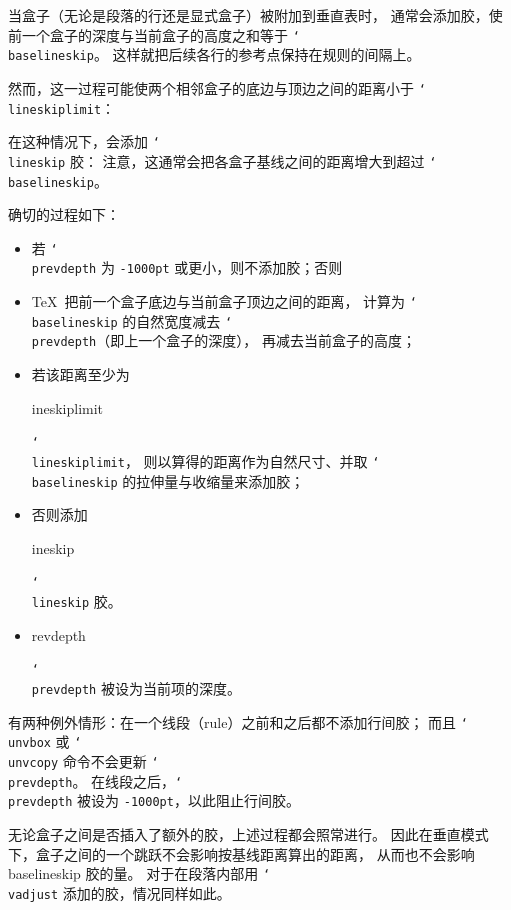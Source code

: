\documentclass[a4paper]{rapport3}
\makeatletter
\def\nl{\protect\\}\def\n#1{{\tt #1}}\def\cs#1{{\tt\char`\\#1}}\let\csc\cs
\newenvironment{disp}{\begin{quotation}}{\end{quotation}}
\def\cstoidx#1\par{\index{#1@\cs{#1}}}
\def\csidx#1{\cstoidx #1\par\cs{#1}}
\makeatother
\begin{document}
当盒子（无论是段落的行还是显式盒子）被附加到垂直表时，
通常会添加胶，使前一个盒子的深度与当前盒子的高度之和等于 \cs{baselineskip}。
这样就把后续各行的参考点保持在规则的间隔上。

\eject


然而，这一过程可能使两个相邻盒子的底边与顶边之间的距离小于 \cs{lineskiplimit}：

在这种情况下，会添加 \cs{lineskip} 胶：
注意，这通常会把各盒子基线之间的距离增大到超过 \cs{baselineskip}。

确切的过程如下：
\begin{itemize}
\item 若 \cs{prevdepth} 为 \n{-1000pt} 或更小，则不添加胶；否则
\item \TeX\ 把前一个盒子底边与当前盒子顶边之间的距离，
计算为 \cs{baselineskip} 的自然宽度减去 \cs{prev\-depth}（即上一个盒子的深度），
再减去当前盒子的高度；
\item 若该距离至少为 \csidx{lineskiplimit}，
则以算得的距离作为自然尺寸、并取 \cs{baselineskip} 的拉伸量与收缩量来添加胶；
\item 否则添加 \csidx{lineskip} 胶。
\item \csidx{prevdepth} 被设为当前项的深度。
\end{itemize}

有两种例外情形：在一个线段（rule）之前和之后都不添加行间胶；
而且 \cs{unvbox} 或 \cs{unvcopy} 命令不会更新 \cs{prevdepth}。
在线段之后，\cs{prevdepth} 被设为 \n{-1000pt}，以此阻止行间胶。

无论盒子之间是否插入了额外的胶，上述过程都会照常进行。
因此在垂直模式下，盒子之间的一个跳跃不会影响按基线距离算出的距离，
从而也不会影响 baselineskip 胶的量。
对于在段落内部用 \cs{vadjust} 添加的胶，情况同样如此。
\end{document}
